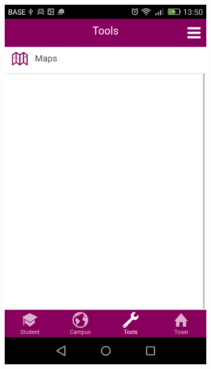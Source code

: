 \documentclass{eplmastersthesis}
\begin{document}
\begin{figure}
\begin{subfigure}[b]{0.3\textwidth}
        \includegraphics[width=\textwidth]{Images/Application_screens/Screenshot_2016-06-06-13-50-14.png}
    \end{subfigure}
    ~ %
    \begin{subfigure}[b]{0.3\textwidth}

\end{subfigure}
\end{figure}
\end{document}
